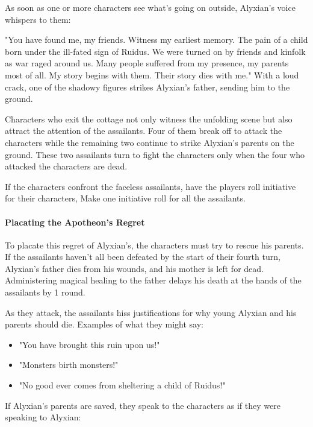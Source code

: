 \documentclass[a4paper, 11pt, bg=full, twocolumn, nooutline]{dndbook}
\begin{document}
As soon as one or more characters see what's going on outside, Alyxian's voice whispers to them:

\begin{DndReadAloud}
"You have found me, my friends. Witness my earliest memory. The pain of a child born under the ill-fated sign of Ruidus. We were turned on by friends and kinfolk as war raged around us. Many people suffered from my presence, my parents most of all. My story begins with them. Their story dies with me."
With a loud crack, one of the shadowy figures strikes Alyxian's father, sending him to the ground.
\end{DndReadAloud}

Characters who exit the cottage not only witness the unfolding scene but also attract the attention of the assailants. Four of them break off to attack the characters while the remaining two continue to strike Alyxian's parents on the ground. These two assailants turn to fight the characters only when the four who attacked the characters are dead.

If the characters confront the faceless assailants, have the players roll initiative for their characters, Make one initiative roll for all the assailants.

\paragraph{Placating the Apotheon's Regret}

To placate this regret of Alyxian's, the characters must try to rescue his parents. If the assailants haven't all been defeated by the start of their fourth turn, Alyxian's father dies from his wounds, and his mother is left for dead. Administering magical healing to the father delays his death at the hands of the assailants by 1 round.

As they attack, the assailants hiss justifications for why young Alyxian and his parents should die. Examples of what they might say:

\begin{itemize}
\item "You have brought this ruin upon us!"
\item "Monsters birth monsters!"
\item "No good ever comes from sheltering a child of Ruidus!"
\end{itemize}

If Alyxian's parents are saved, they speak to the characters as if they were speaking to Alyxian:
\end{document}
